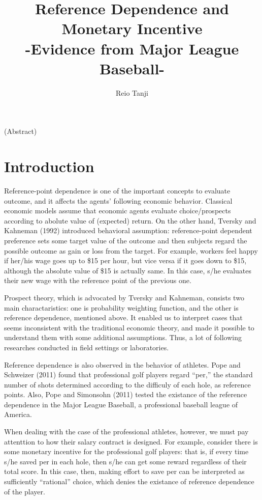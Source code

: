 \documentclass[dvipdfmx, 12pt]{article}
\begin{document}
\title{Reference Dependence and Monetary Incentive \\
-Evidence from Major League Baseball-}
\author{Reio Tanji}
\date{}
\maketitle

\begin{center}
  (Abstract)
\end{center}


\section{Introduction}

Reference-point dependence is one of the important concepts to
evaluate outcome, and it affects the agents' following
economic behavior. Classical economic models assume that
economic agents evaluate choice/prospects according to abolute
value of (expected) return. On the other hand, Tversky and
Kahneman (1992) introduced behavioral
assumption: reference-point dependent preference sets some
target value of the outcome and then subjects regard the
possible outcome as gain or loss from the target.
For example, workers feel happy if her/his wage goes up
to \$15 per hour, but vice versa if it goes down to \$15,
although the absolute value of \$15 is actually same. In this case,
s/he evaluates their new wage with the reference point of
the previous one.

Prospect theory, which is advocated by Tversky and Kahneman, consists
two main charactaristics: one is probability weighting function, and
the other is reference dependence, mentioned above. It enabled us to
interpret cases that seems inconsistent with the traditional economic
theory, and made it possible to understand them with some additional
assumptions. Thus, a lot of following researches conducted in field
settings or laboratories.

Reference dependence is also observed in the behavior of athletes.
Pope and Schweizer (2011) found that professional golf players regard
``per,'' the standard number of shots determined according to the
difficuly of each hole, as reference points. Also, Pope and Simonsohn
(2011) tested the existance of the reference dependence in the Major
League Baseball, a professional baseball league of America.

When dealing with the case of the professional athletes, however, we
must pay attenttion to how their salary contract is designed.
For example, consider there is some monetary incentive for the
professional golf players:
that is, if every time s/he saved per in each hole, then s/he can get
some reward regardless of their total score.
In this case, then, making effort to save per can be interpreted
as sufficiently ``rational'' choice, which denies the existance of 
reference dependence of the player.
\end{document}
